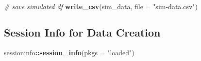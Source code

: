 \documentclass[
]{book}
\newenvironment{Shaded}{\begin{snugshade}}{\end{snugshade}}
\newcommand{\AttributeTok}[1]{\textcolor[rgb]{0.13,0.29,0.53}{#1}}
\newcommand{\CommentTok}[1]{\textcolor[rgb]{0.56,0.35,0.01}{\textit{#1}}}
\newcommand{\FunctionTok}[1]{\textcolor[rgb]{0.13,0.29,0.53}{\textbf{#1}}}
\newcommand{\NormalTok}[1]{#1}
\newcommand{\SpecialCharTok}[1]{\textcolor[rgb]{0.81,0.36,0.00}{\textbf{#1}}}
\newcommand{\StringTok}[1]{\textcolor[rgb]{0.31,0.60,0.02}{#1}}
\begin{document}
\begin{Shaded}
\begin{Highlighting}[]
\CommentTok{\# save simulated df}
\FunctionTok{write\_csv}\NormalTok{(sim\_data, }\AttributeTok{file =} \StringTok{"sim{-}data.csv"}\NormalTok{)}
\end{Highlighting}
\end{Shaded}

\subsection{Session Info for Data Creation}\label{session-info-for-data-creation}

\begin{Shaded}
\begin{Highlighting}[]
\NormalTok{sessioninfo}\SpecialCharTok{::}\FunctionTok{session\_info}\NormalTok{(}\AttributeTok{pkgs =} \StringTok{"loaded"}\NormalTok{)}
\end{Highlighting}
\end{Shaded}
\end{document}
